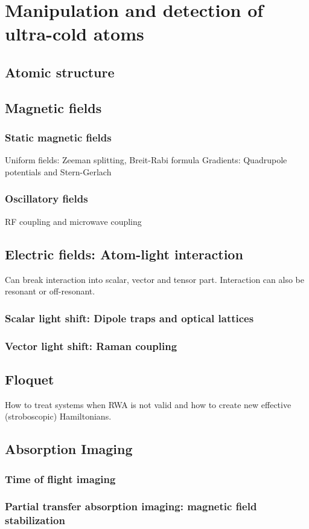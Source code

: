 
\renewcommand{\thechapter}{4}

\chapter{Manipulation and detection of ultra-cold atoms}

\section{Atomic structure}

\section{Magnetic fields}
\subsection{Static magnetic fields}
Uniform fields: Zeeman splitting, Breit-Rabi formula
Gradients: Quadrupole potentials and Stern-Gerlach

\subsection{Oscillatory fields}
RF coupling and microwave coupling

\section{Electric fields: Atom-light interaction}

Can break interaction into scalar, vector and tensor part. Interaction can also be resonant or off-resonant.

\subsection{Scalar light shift: Dipole traps and optical lattices}

\subsection{Vector light shift: Raman coupling}

\section{Floquet}
How to treat systems when RWA is not valid and how to create new effective (stroboscopic) Hamiltonians.

\section{Absorption Imaging}
\subsection{Time of flight imaging}
\subsection{Partial transfer absorption imaging: magnetic field stabilization}


